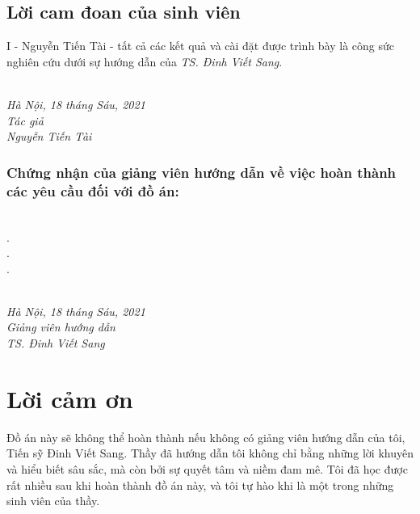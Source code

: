 \documentclass[a4paper, 13pt, oneside]{report}
\begin{document}
\begin{spacing}{1.0}
    \section*{Lời cam đoan của sinh viên}
    I - Nguyễn Tiến Tài - tất cả các kết quả và cài đặt được trình bày là công sức nghiên cứu dưới sự hướng dẫn của \textit{TS. Đinh Viết Sang}.\\\\
    
    \begin{minipage}{0.5\textwidth}
        \hfill
    \end{minipage}
    \begin{minipage}[t]{0.5\textwidth}
        \begin{center}
        \textit{Hà Nội, 18 tháng Sáu, 2021\\Tác giả\\[2.5cm]Nguyễn Tiến Tài}
        \end{center}
    \end{minipage}
    \subsection*{Chứng nhận của giảng viên hướng dẫn về việc hoàn thành các yêu cầu đối với đồ án:}
    \dotfill\\.\dotfill\\.\dotfill\\.\dotfill\\\\
    \begin{minipage}{0.5\textwidth}
        \hfill
    \end{minipage}
    \begin{minipage}[t]{0.5\textwidth}
        \begin{center}
    \textit{Hà Nội, 18 tháng Sáu, 2021\\Giảng viên hướng dẫn\\[2.5cm]TS. Đinh Viết Sang}
        \end{center}
    \end{minipage}
\end{spacing}

\chapter*{Lời cảm ơn}
Đồ án này sẽ không thể hoàn thành nếu không có giảng viên hướng dẫn của tôi, Tiến sỹ Đinh Viết Sang. Thầy đã hướng dẫn tôi không chỉ bằng những lời khuyên và hiểu biết sâu sắc, mà còn bởi sự quyết tâm và niềm đam mê. Tôi đã học được rất nhiều sau khi hoàn thành đồ án này, và tôi tự hào khi là một trong những sinh viên của thầy.
\end{document}
